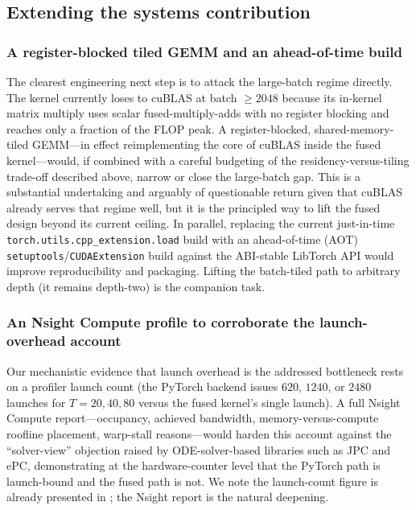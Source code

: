 \subsection{Extending the systems contribution}

\subsubsection{A register-blocked tiled GEMM and an ahead-of-time build}

The clearest engineering next step is to attack the large-batch regime directly.
The kernel currently loses to cuBLAS at batch $\geq 2048$ because its in-kernel
matrix multiply uses scalar fused-multiply-adds with no register blocking and reaches
only a fraction of the FLOP peak. A register-blocked, shared-memory-tiled GEMM---in
effect reimplementing the core of cuBLAS inside the fused kernel---would, if
combined with a careful budgeting of the residency-versus-tiling trade-off described
above, narrow or close the large-batch gap. This is a substantial undertaking and
arguably of questionable return given that cuBLAS already serves that regime well,
but it is the principled way to lift the fused design beyond its current ceiling. In
parallel, replacing the current just-in-time \texttt{torch.utils.cpp\_extension.load}
build with an ahead-of-time (AOT) \texttt{setuptools}/\texttt{CUDAExtension} build
against the ABI-stable LibTorch API would improve reproducibility and packaging.
Lifting the batch-tiled path to arbitrary depth (it remains depth-two) is the
companion task.

\subsubsection{An Nsight Compute profile to corroborate the launch-overhead account}

Our mechanistic evidence that launch overhead is the addressed bottleneck rests on a
profiler launch count (the PyTorch backend issues $620$, $1240$, or $2480$ launches
for $T = 20, 40, 80$ versus the fused kernel's single launch). A full Nsight Compute
report---occupancy, achieved bandwidth, memory-versus-compute roofline placement,
warp-stall reasons---would harden this account against the ``solver-view'' objection
raised by ODE-solver-based libraries such as JPC and ePC, demonstrating at the
hardware-counter level that the PyTorch path is launch-bound and the fused path is
not. We note the launch-count figure is already presented in ;
the Nsight report is the natural deepening.

